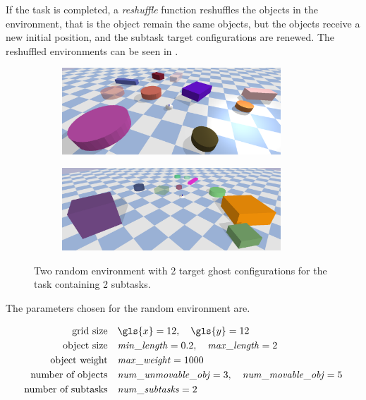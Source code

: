 If the task is completed, a \textit{reshuffle} function reshuffles the objects in the environment, that is the object remain the same objects, but the objects receive a new initial position, and the subtask target configurations are renewed. The reshuffled environments can be seen in .\bs

\begin{figure}[H]
    \centering
    \begin{subfigure}{\textwidth}
    \centering
    \includegraphics[width=0.9\textwidth]{figures/tests/random_1}
    \end{subfigure}

    \vspace{0.2cm}
    \begin{subfigure}{\textwidth}
    \centering
    \includegraphics[width=0.9\textwidth]{figures/tests/random_2}
    \end{subfigure}
    \caption{Two random environment with 2 target ghost configurations for the task containing 2 subtasks.}%
    \label{fig:random_environnment}
\end{figure}

The parameters chosen for the random environment are.\bs

\begin{center}
\begin{align*}
\text{grid size} \quad &\gls{x}=12, \quad \gls{y}=12 \\
\text{object size} \quad &\mathit{min\_length}=0.2, \quad \mathit{max\_length}=2 \\
\text{object weight} \quad &\mathit{max\_weight}=1000 \\
\text{number of objects} \quad &\mathit{num\_unmovable\_obj}=3, \quad \mathit{num\_movable\_obj}=5 \\
\text{number of subtasks} \quad &\mathit{num\_subtasks}=2
\end{align*}
\end{center}

